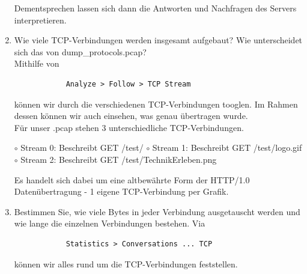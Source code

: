 \documentclass[11pt]{article}
\begin{document}
\begin{enumerate}[\thesection .1]
        Dementsprechen lassen sich dann die Antworten und Nachfragen des Servers interpretieren.

\pagebreak
        \item Wie viele TCP-Verbindungen werden insgesamt aufgebaut? Wie unterscheidet sich das von dump\_protocols.pcap?\\
        Mithilfe von
        \begin{verbatim}
            Analyze > Follow > TCP Stream
        \end{verbatim}
        können wir durch die verschiedenen TCP-Verbindungen tooglen. Im Rahmen dessen können wir auch einsehen, was genau übertragen wurde.\\
        Für unser .pcap stehen 3 unterschiedliche TCP-Verbindungen.
        \begin{addmargin}[1em]{1em}
            $\circ$ Stream 0: Beschreibt GET /test/
            $\circ$ Stream 1: Beschreibt GET /test/logo.gif
            $\circ$ Stream 2: Beschreibt GET /test/TechnikErleben.png
        \end{addmargin}
        Es handelt sich dabei um eine altbewährte Form der HTTP/1.0 Datenübertragung - 1 eigene TCP-Verbindung per Grafik.

        \item Bestimmen Sie, wie viele Bytes in jeder Verbindung ausgetauscht werden und wie lange die einzelnen Verbindungen bestehen.
        Via
        \begin{verbatim}
            Statistics > Conversations ... TCP
        \end{verbatim}
        können wir alles rund um die TCP-Verbindungen feststellen.
    \end{enumerate}
\end{document}
